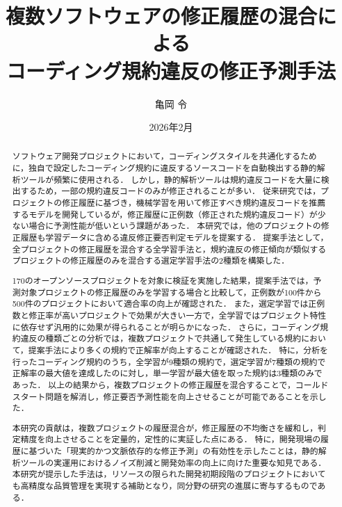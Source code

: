 \documentclass[11pt]{jreport}
\title{複数ソフトウェアの修正履歴の混合による\\コーディング規約違反の修正予測手法}
\author{亀岡 令}
\date{2026年2月}
\begin{document}
\maketitle

\begin{abstract}
ソフトウェア開発プロジェクトにおいて，コーディングスタイルを共通化するために，独自で設定したコーディング規約に違反するソースコードを自動検出する静的解析ツールが頻繁に使用される．
しかし，静的解析ツールは規約違反コードを大量に検出するため，一部の規約違反コードのみが修正されることが多い．
従来研究では，プロジェクトの修正履歴に基づき，機械学習を用いて修正すべき規約違反コードを推薦するモデルを開発しているが，修正履歴に正例数（修正された規約違反コード）が少ない場合に予測性能が低いという課題があった．
本研究では，他のプロジェクトの修正履歴も学習データに含める違反修正要否判定モデルを提案する．
提案手法として，全プロジェクトの修正履歴を混合する全学習手法と，規約違反の修正傾向が類似するプロジェクトの修正履歴のみを混合する選定学習手法の2種類を構築した．

170のオープンソースプロジェクトを対象に検証を実施した結果，提案手法では，予測対象プロジェクトの修正履歴のみを学習する場合と比較して，正例数が100件から500件のプロジェクトにおいて適合率の向上が確認された．
また，選定学習では正例数と修正率が高いプロジェクトで効果が大きい一方で，全学習ではプロジェクト特性に依存せず汎用的に効果が得られることが明らかになった．
さらに，コーディング規約違反の種類ごとの分析では，複数プロジェクトで共通して発生している規約において，提案手法により多くの規約で正解率が向上することが確認された．
特に，分析を行ったコーディング規約のうち，全学習が9種類の規約で，選定学習が7種類の規約で正解率の最大値を達成したのに対し，単一学習が最大値を取った規約は3種類のみであった．
以上の結果から，複数プロジェクトの修正履歴を混合することで，コールドスタート問題を解消し，修正要否予測性能を向上させることが可能であることを示した．

本研究の貢献は，複数プロジェクトの履歴混合が，修正履歴の不均衡さを緩和し，判定精度を向上させることを定量的，定性的に実証した点にある．
特に，開発現場の履歴に基づいた「現実的かつ文脈依存的な修正予測」の有効性を示したことは，静的解析ツールの実運用におけるノイズ削減と開発効率の向上に向けた重要な知見である．
本研究が提示した手法は，リソースの限られた開発初期段階のプロジェクトにおいても高精度な品質管理を実現する補助となり，同分野の研究の進展に寄与するものである．
\end{abstract}

\tableofcontents

\end{document}
